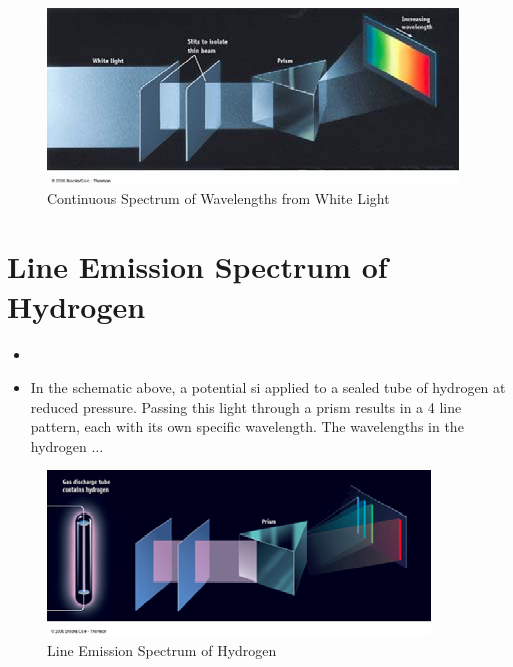 \documentclass[
	chapter=7,
	title={Quantum Theory {\&} the Electronic Structure of Atoms},
	showanswers=true,
]{chem122notes}
\begin{document}
\begin{figure}[H]
	\centering
	\includegraphics[width=\textwidth]{chapter7/continuous-spectrum}
	\caption{Continuous Spectrum of Wavelengths from White Light}
	\label{fig:continuous-spectrum}
\end{figure}

\section{Line Emission Spectrum of Hydrogen}\label{sec:line-emission-spectrum-of-hydrogen}
\begin{itemize}
	\item {}
	\item In the schematic above, a potential si applied to a sealed tube of hydrogen at reduced pressure.
	Passing this light through a prism results in a 4 line pattern, each with its own specific wavelength.
	The wavelengths in the hydrogen $\dots$
\end{itemize}

\begin{figure}[H]
	\centering
	\includegraphics[width=\textwidth]{chapter7/line_emission}
	\caption{Line Emission Spectrum of Hydrogen}
	\label{fig:line-emission}
\end{figure}
\end{document}
